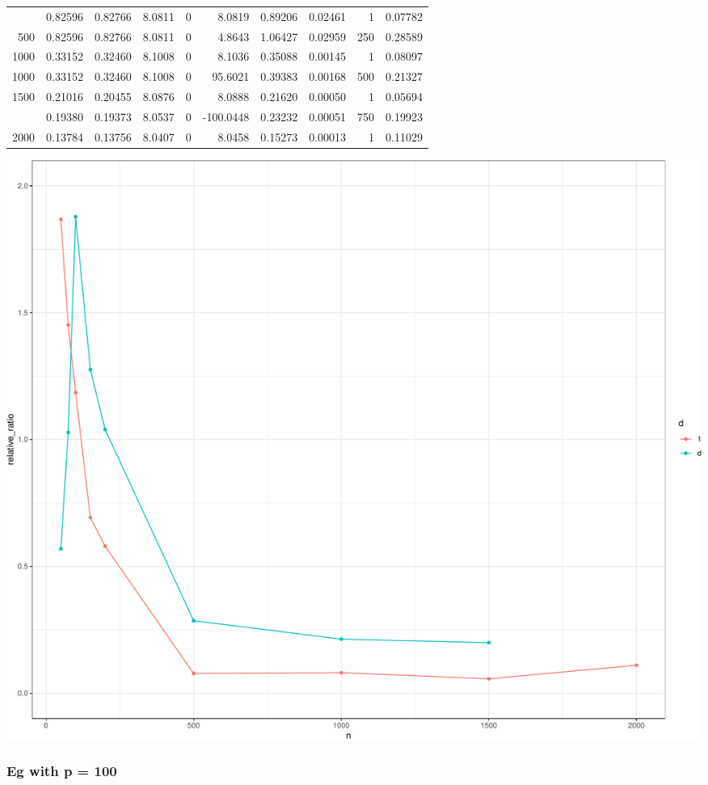 \documentclass[]{article}
\begin{document}
\begin{longtable}{rrrrrrrrrr}
\addlinespace
500 & 0.82596 & 0.82766 & 8.0811 & 0 & 8.0819 & 0.89206 & 0.02461 & 1 & 0.07782\\
500 & 0.82596 & 0.82766 & 8.0811 & 0 & 4.8643 & 1.06427 & 0.02959 & 250 & 0.28589\\
1000 & 0.33152 & 0.32460 & 8.1008 & 0 & 8.1036 & 0.35088 & 0.00145 & 1 & 0.08097\\
1000 & 0.33152 & 0.32460 & 8.1008 & 0 & 95.6021 & 0.39383 & 0.00168 & 500 & 0.21327\\
1500 & 0.21016 & 0.20455 & 8.0876 & 0 & 8.0888 & 0.21620 & 0.00050 & 1 & 0.05694\\
\addlinespace
1500 & 0.19380 & 0.19373 & 8.0537 & 0 & -100.0448 & 0.23232 & 0.00051 & 750 & 0.19923\\
2000 & 0.13784 & 0.13756 & 8.0407 & 0 & 8.0458 & 0.15273 & 0.00013 & 1 & 0.11029\\*
\end{longtable}

\endgroup{}

\includegraphics{GCTA_and_rr_v_jack_correction_iterations_files/figure-latex/unnamed-chunk-14-1.pdf}

\subsubsection{Eg with p = 100}\label{eg-with-p-100}

\begingroup\fontsize{5}{7}\selectfont
\end{document}
